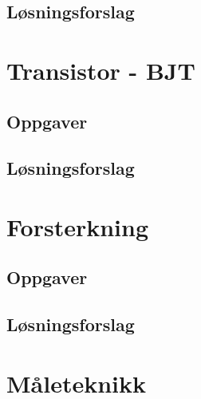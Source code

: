 \documentclass[12pt]{report}
\begin{document}
\subsection{Løsningsforslag}
\printsolutions[section]

\newpage

\section{Transistor - BJT}
\label{sec:tranBJT}

\subsection{Oppgaver}

\subsection{Løsningsforslag}
\printsolutions[section]

\newpage




\section{Forsterkning}
\label{sec:forsterk}

\subsection{Oppgaver}

\subsection{Løsningsforslag}
\printsolutions[section]



\newpage
\section{Måleteknikk}

\newpage

\printbibliography%

\appendix

\end{document}
